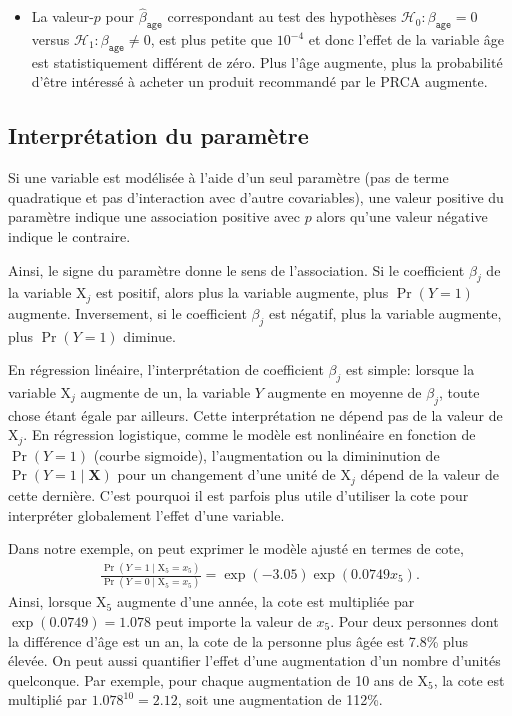 \documentclass[
  11pt,
  letterpaper,
]{scrbook}
\providecommand{\tightlist}{%
  \setlength{\itemsep}{0pt}\setlength{\parskip}{0pt}}\usepackage{longtable,booktabs,array}
\theoremstyle{definition}
\theoremstyle{remark}
\begin{document}
\begin{itemize}
\tightlist
\item
  La valeur-\(p\) pour \(\widehat{\beta}_{\texttt{age}}\) correspondant
  au test des hypothèses \(\mathscr{H}_0: \beta_{\texttt{age}}=0\)
  versus \(\mathscr{H}_1: \beta_{\texttt{age}} \neq 0\), est plus petite
  que \(10^{-4}\) et donc l'effet de la variable âge est statistiquement
  différent de zéro. Plus l'âge augmente, plus la probabilité d'être
  intéressé à acheter un produit recommandé par le PRCA augmente.
\end{itemize}

\hypertarget{interpruxe9tation-du-paramuxe8tre}{%
\subsection{Interprétation du
paramètre}\label{interpruxe9tation-du-paramuxe8tre}}

Si une variable est modélisée à l'aide d'un seul paramètre (pas de terme
quadratique et pas d'interaction avec d'autre covariables), une valeur
positive du paramètre indique une association positive avec \(p\) alors
qu'une valeur négative indique le contraire.

Ainsi, le signe du paramètre donne le sens de l'association. Si le
coefficient \(\beta_j\) de la variable \(\mathrm{X}_j\) est positif,
alors plus la variable augmente, plus \(\Pr(Y=1)\) augmente.
Inversement, si le coefficient \(\beta_j\) est négatif, plus la variable
augmente, plus \(\Pr(Y=1)\) diminue.

En régression linéaire, l'interprétation de coefficient \(\beta_j\) est
simple: lorsque la variable \(\mathrm{X}_j\) augmente de un, la variable
\(Y\) augmente en moyenne de \(\beta_j\), toute chose étant égale par
ailleurs. Cette interprétation ne dépend pas de la valeur de
\(\mathrm{X}_j\). En régression logistique, comme le modèle est
nonlinéaire en fonction de \(\Pr(Y=1)\) (courbe sigmoide),
l'augmentation ou la dimininution de \(\Pr(Y=1\mid \mathbf{X})\) pour un
changement d'une unité de \(\mathrm{X}_j\) dépend de la valeur de cette
dernière. C'est pourquoi il est parfois plus utile d'utiliser la cote
pour interpréter globalement l'effet d'une variable.

Dans notre exemple, on peut exprimer le modèle ajusté en termes de cote,
\begin{align*}
 \frac{\Pr(Y=1 \mid \mathrm{X}_5=x_5)}{\Pr(Y=0 \mid \mathrm{X}_5=x_5)} = \exp(-3.05)\exp(0.0749x_5).
\end{align*} Ainsi, lorsque \(\mathrm{X}_5\) augmente d'une année, la
cote est multipliée par \(\exp(0.0749) = 1.078\) peut importe la valeur
de \(x_5\). Pour deux personnes dont la différence d'âge est un an, la
cote de la personne plus âgée est 7.8\% plus élevée. On peut aussi
quantifier l'effet d'une augmentation d'un nombre d'unités quelconque.
Par exemple, pour chaque augmentation de 10 ans de \(\mathrm{X}_5\), la
cote est multiplié par \(1.078^{10} = 2.12\), soit une augmentation de
112\%.
\end{document}
